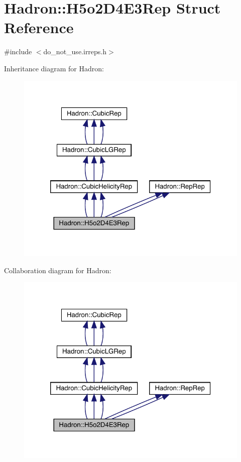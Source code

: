 \hypertarget{structHadron_1_1H5o2D4E3Rep}{}\section{Hadron\+:\+:H5o2\+D4\+E3\+Rep Struct Reference}
\label{structHadron_1_1H5o2D4E3Rep}


{\ttfamily \#include $<$do\+\_\+not\+\_\+use.\+irreps.\+h$>$}



Inheritance diagram for Hadron\+:
\nopagebreak
\begin{figure}[H]
\begin{center}
\leavevmode
\includegraphics[width=320pt]{d9/d1e/structHadron_1_1H5o2D4E3Rep__inherit__graph}
\end{center}
\end{figure}


Collaboration diagram for Hadron\+:
\nopagebreak
\begin{figure}[H]
\begin{center}
\leavevmode
\includegraphics[width=320pt]{df/dea/structHadron_1_1H5o2D4E3Rep__coll__graph}
\end{center}
\end{figure}
